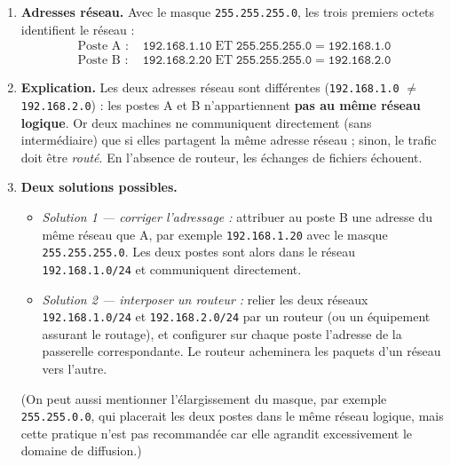 \documentclass[11pt]{article}
\begin{document}
\begin{corrige}
\begin{enumerate}
\item \textbf{Adresses réseau.} Avec le masque \texttt{255.255.255.0}, les trois premiers octets identifient le réseau :
\begin{align*}
\text{Poste A : } & \texttt{192.168.1.10} \;\mathrm{ET}\; \texttt{255.255.255.0} = \texttt{192.168.1.0} \\
\text{Poste B : } & \texttt{192.168.2.20} \;\mathrm{ET}\; \texttt{255.255.255.0} = \texttt{192.168.2.0}
\end{align*}
\item \textbf{Explication.} Les deux adresses réseau sont différentes (\texttt{192.168.1.0} $\neq$ \texttt{192.168.2.0}) : les postes A et B n'appartiennent \textbf{pas au même réseau logique}. Or deux machines ne communiquent directement (sans intermédiaire) que si elles partagent la même adresse réseau ; sinon, le trafic doit être \emph{routé}. En l'absence de routeur, les échanges de fichiers échouent.
\item \textbf{Deux solutions possibles.}
\begin{itemize}
\item \emph{Solution 1 — corriger l'adressage :} attribuer au poste B une adresse du même réseau que A, par exemple \texttt{192.168.1.20} avec le masque \texttt{255.255.255.0}. Les deux postes sont alors dans le réseau \texttt{192.168.1.0/24} et communiquent directement.
\item \emph{Solution 2 — interposer un routeur :} relier les deux réseaux \texttt{192.168.1.0/24} et \texttt{192.168.2.0/24} par un routeur (ou un équipement assurant le routage), et configurer sur chaque poste l'adresse de la passerelle correspondante. Le routeur acheminera les paquets d'un réseau vers l'autre.
\end{itemize}
(On peut aussi mentionner l'élargissement du masque, par exemple \texttt{255.255.0.0}, qui placerait les deux postes dans le même réseau logique, mais cette pratique n'est pas recommandée car elle agrandit excessivement le domaine de diffusion.)
\end{enumerate}
\end{corrige}
\end{document}
